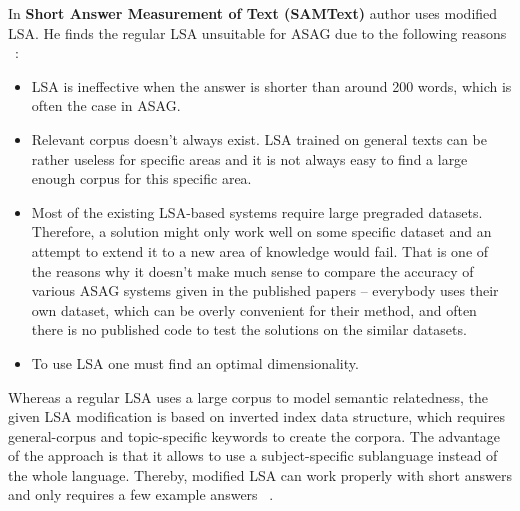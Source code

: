 In \textbf{Short Answer Measurement of Text (SAMText)} author uses modified LSA. He finds the regular LSA unsuitable for ASAG due to the following reasons ~\cite{SAMText}:
\begin{itemize}
\item LSA is ineffective when the answer is shorter than around 200 words, which is often the case in ASAG.
\item Relevant corpus doesn't always exist. LSA trained on general texts can be rather useless for specific areas and it is not always easy to find a large enough corpus for this specific area.
\item Most of the existing LSA-based systems require large pregraded datasets. Therefore, a solution might only work well on some specific dataset and an attempt to extend it to a new area of knowledge would fail. That is one of the reasons why it doesn't make much sense to compare the accuracy of various ASAG systems given in the published papers -- everybody uses their own dataset, which can be overly convenient for their method, and often there is no published code to test the solutions on the similar datasets. 
\item To use LSA one must find an optimal dimensionality.
\end{itemize}
Whereas a regular LSA uses a large corpus to model semantic relatedness, the given LSA modification is based on inverted index data structure, which requires general-corpus and topic-specific keywords to create the corpora. The advantage of the approach is that it allows to use a subject-specific sublanguage  instead of the whole language. Thereby, modified LSA can work properly with short answers and only requires a few example answers ~\cite{Burrows}.\\

